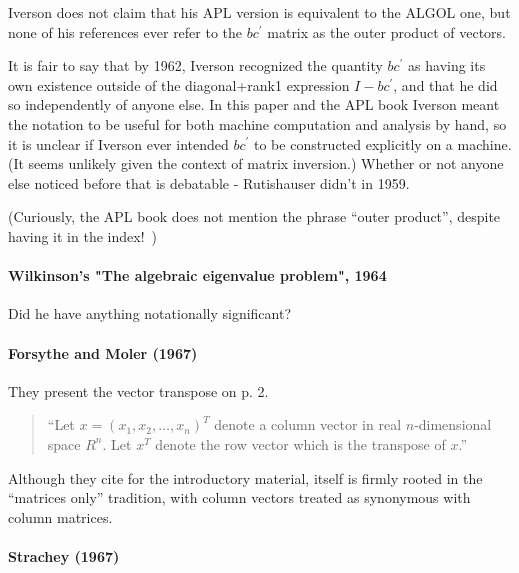 Iverson does not claim that his APL version is equivalent to the ALGOL one, but none of his references ever refer to the $b c^\prime$ matrix as the outer product of vectors.

It is fair to say that by 1962, Iverson recognized the quantity $b c^\prime$ as having its own existence outside of the diagonal+rank1 expression $I - b c^\prime$, and that he did so independently of anyone else. In this paper and the APL book Iverson meant the notation to be useful for both machine computation and analysis by hand, so it is unclear if Iverson ever intended $b c^\prime$ to be constructed explicitly on a machine. (It seems unlikely given the context of matrix inversion.) Whether or not anyone else noticed before that is debatable - Rutishauser didn't in 1959.

(Curiously, the APL book does not mention the phrase ``outer product'', despite having it in the index!~\cite{Iverson1962book})


\paragraph{Wilkinson's "The algebraic eigenvalue problem", 1964}

Did he have anything notationally significant?



\paragraph{Forsythe and Moler (1967)~\cite{Forsythe1967}}

They present the vector transpose on p. 2.
\begin{quote}
``Let $x = (x_1, x_2, \dots, x_n)^T$ denote a column vector in real $n$-dimensional space $R^n$. Let $x^T$ denote the row vector which is the transpose of $x$.''~\cite[p. 2]{Forsythe1967}
\end{quote}

Although they cite \cite{Faddeev1959} for the introductory material, \cite{Faddeev1959} itself is firmly rooted in the ``matrices only'' tradition, with column vectors treated as synonymous with column matrices.




\paragraph{Strachey (1967)~\cite{Strachey1967}}

